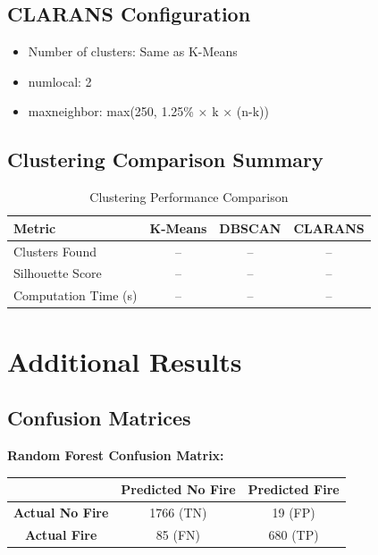\section*{CLARANS Configuration}
\begin{itemize}
    \item Number of clusters: Same as K-Means
    \item numlocal: 2
    \item maxneighbor: max(250, 1.25\% × k × (n-k))
\end{itemize}

\section*{Clustering Comparison Summary}
\begin{table}[H]
\centering
\caption{Clustering Performance Comparison}
\begin{tabular}{|l|c|c|c|}
\hline
\textbf{Metric} & \textbf{K-Means} & \textbf{DBSCAN} & \textbf{CLARANS} \\
\hline
Clusters Found & -- & -- & -- \\
Silhouette Score & -- & -- & -- \\
Computation Time (s) & -- & -- & -- \\
\hline
\end{tabular}
\end{table}

\chapter{Additional Results}
\label{app:results}

\section*{Confusion Matrices}

\textbf{Random Forest Confusion Matrix:}
\begin{table}[H]
\centering
\begin{tabular}{|c|c|c|}
\hline
 & \textbf{Predicted No Fire} & \textbf{Predicted Fire} \\
\hline
\textbf{Actual No Fire} & 1766 (TN) & 19 (FP) \\
\hline
\textbf{Actual Fire} & 85 (FN) & 680 (TP) \\
\hline
\end{tabular}
\end{table}


